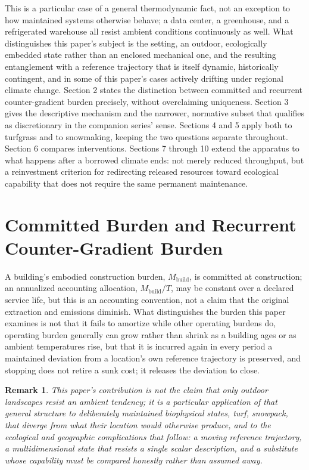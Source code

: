 \documentclass[11pt]{article}
\newtheorem{remark}[definition]{Remark}
\begin{document}
This is a particular case of a general thermodynamic fact, not an exception to how maintained systems otherwise behave; a data center, a greenhouse, and a refrigerated warehouse all resist ambient conditions continuously as well. What distinguishes this paper's subject is the setting, an outdoor, ecologically embedded state rather than an enclosed mechanical one, and the resulting entanglement with a reference trajectory that is itself dynamic, historically contingent, and in some of this paper's cases actively drifting under regional climate change. Section 2 states the distinction between committed and recurrent counter-gradient burden precisely, without overclaiming uniqueness. Section 3 gives the descriptive mechanism and the narrower, normative subset that qualifies as discretionary in the companion series' sense. Sections 4 and 5 apply both to turfgrass and to snowmaking, keeping the two questions separate throughout. Section 6 compares interventions. Sections 7 through 10 extend the apparatus to what happens after a borrowed climate ends: not merely reduced throughput, but a reinvestment criterion for redirecting released resources toward ecological capability that does not require the same permanent maintenance.

\section{Committed Burden and Recurrent Counter-Gradient Burden}

A building's embodied construction burden, $M_{\text{build}}$, is committed at construction; an annualized accounting allocation, $M_{\text{build}}/T$, may be constant over a declared service life, but this is an accounting convention, not a claim that the original extraction and emissions diminish. What distinguishes the burden this paper examines is not that it fails to amortize while other operating burdens do, operating burden generally can grow rather than shrink as a building ages or as ambient temperatures rise, but that it is incurred again in every period a maintained deviation from a location's own reference trajectory is preserved, and stopping does not retire a sunk cost; it releases the deviation to close.

\begin{remark}
This paper's contribution is not the claim that only outdoor landscapes resist an ambient tendency; it is a particular application of that general structure to deliberately maintained biophysical states, turf, snowpack, that diverge from what their location would otherwise produce, and to the ecological and geographic complications that follow: a moving reference trajectory, a multidimensional state that resists a single scalar description, and a substitute whose capability must be compared honestly rather than assumed away.
\end{remark}
\end{document}
